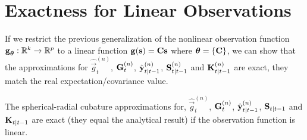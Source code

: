 \section{Exactness for Linear Observations}
	\label{app:ngkExactness}

	If we restrict the previous generalization of the nonlinear observation function \( \boldsymbol{\mathrm{g}}_{\boldsymbol{\mathrm{\theta}}} : \mathbb{R}^k \to \mathbb{R}^p \) to a linear function \( \boldsymbol{\mathrm{g}}(\boldsymbol{\mathrm{s}}) = \boldsymbol{\mathrm{C}} \boldsymbol{\mathrm{s}} \) where \( \boldsymbol{\mathrm{\theta}} = \{ \boldsymbol{\mathrm{C}} \} \), we can show that the approximations for \( \hat{\vec{g}}_t^{(n)} \), \( \boldsymbol{\mathrm{G}}_t^{(n)} \), \( \hat{\boldsymbol{\mathrm{y}}}_{t \vert t - 1}^{(n)} \), \( \boldsymbol{\mathrm{S}}_{t \vert t - 1}^{(n)} \) and \( \boldsymbol{\mathrm{K}}_{t \vert t - 1}^{(n)} \) are exact, \ie they match the real expectation/covariance value.

	\begin{theorem}
		The spherical-radial cubature approximations for, \( \hat{\vec{g}}_t^{(n)} \), \( \boldsymbol{\mathrm{G}}_t^{(n)} \), \( \hat{\boldsymbol{\mathrm{y}}}_{t \vert t - 1}^{(n)} \), \( \boldsymbol{\mathrm{S}}_{t \vert t - 1} \) and \( \boldsymbol{\mathrm{K}}_{t \vert t - 1} \) are exact (\ie they equal the analytical result) if the observation function is linear.
	\end{theorem}
